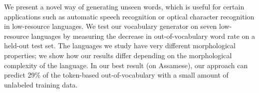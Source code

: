 We present a novel way of generating unseen words, which is useful for certain applications such as automatic speech recognition or optical character recognition in low-resource languages. We test our vocabulary generator on seven low-resource languages by measuring the decrease in out-of-vocabulary word rate on a held-out test set. The languages we study have very different morphological properties; we show how our results differ depending on the morphological complexity of the language. In our best result (on Assamese), our approach can predict 29\% of the token-based out-of-vocabulary with a small amount of unlabeled training data.
